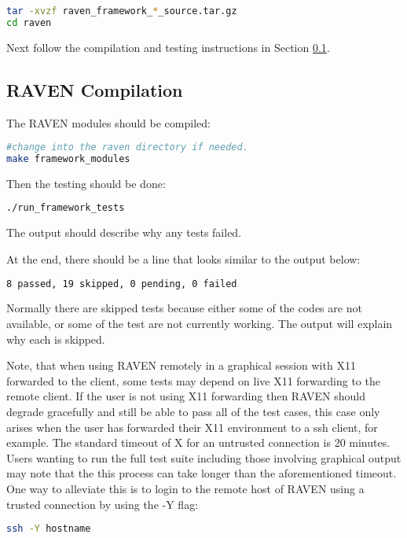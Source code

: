 \begin{lstlisting}[language=bash]
tar -xvzf raven_framework_*_source.tar.gz
cd raven
\end{lstlisting}

Next follow the compilation and testing instructions in Section
\ref{raven_compilation}.

\subsection{RAVEN Compilation}
\label{raven_compilation}

The RAVEN modules should be compiled:

\begin{lstlisting}[language=bash]
#change into the raven directory if needed.
make framework_modules
\end{lstlisting}

Then the testing should be done:

\begin{lstlisting}[language=bash]
./run_framework_tests
\end{lstlisting}

The output should describe why any tests failed.

At the end, there should be a line that looks similar to the output below:
\begin{lstlisting}[language=bash]
8 passed, 19 skipped, 0 pending, 0 failed
\end{lstlisting}

Normally there are skipped tests because either some of the codes are
not available, or some of the test are not currently working.  The
output will explain why each is skipped.

Note, that when using RAVEN remotely in a graphical session with X11 forwarded
to the client, some tests may depend on live X11 forwarding to the remote
client. If the user is not using X11 forwarding then RAVEN should degrade
gracefully and still be able to pass all of the test cases, this case only
arises when the user has forwarded their X11 environment to a ssh client, for
example. The standard timeout of X for an untrusted connection is 20 minutes.
Users wanting to run the full test suite including those involving
graphical output may note that the this process can take longer than the
aforementioned timeout. One way to alleviate this is to login to the remote
host of RAVEN using a trusted connection by using the -Y flag:

\begin{lstlisting}[language=bash]
ssh -Y hostname
\end{lstlisting}

